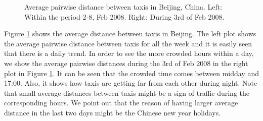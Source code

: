 \documentclass[article]{jss}
\begin{document}
\begin{figure}[!h]
  \centering
  \caption{Average pairwise distance between taxis in Beijing, China. Left: Within the period 2-8, Feb 2008. Right: During 3rd of Feb 2008.}
  \label{distbijing}
  \end{figure}
Figure \ref{distbijing} shows the average distance between taxis in Beijing. The left plot shows the average pairwise distance between taxis for all the week and it is easily seen that there is a daily trend. In order to see the more crowded hours within a day, we show the average pairwise distances during the 3rd of Feb 2008 in the right plot in Figure \ref{distbijing}. It can be seen that the crowded time comes between midday and 17:00. Also, it shows how taxis are getting far from each other during night. Note that small average distances between taxis might be a sign of traffic during the corresponding hours. We point out that the reason of having larger average distance in the last two days might be the Chinese new year holidays.
\end{document}
